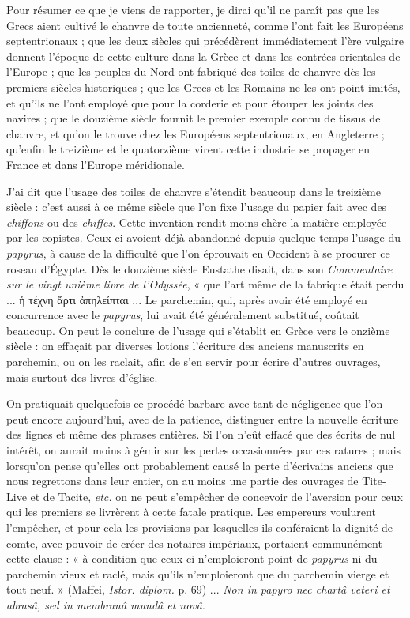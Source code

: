 \documentclass[a4paper, 11pt, oneside, polutonikogreek]{article}
\begin{document}
Pour résumer ce que je viens de rapporter, je dirai qu'il ne paraît pas que les Grecs aient cultivé le chanvre de toute ancienneté, comme l'ont fait les Européens septentrionaux ; que les deux siècles qui précédèrent immédiatement l'ère vulgaire donnent l'époque de cette culture dans la Grèce et dans les contrées orientales de l'Europe ; que les peuples du Nord ont fabriqué des toiles de chanvre dès les premiers siècles historiques ; que les Grecs et les Romains ne les ont point imités, et qu'ils ne l'ont employé que pour la corderie et pour étouper les joints des navires ; que le douzième siècle fournit le premier exemple connu de tissus de chanvre, et qu'on le trouve chez les Européens septentrionaux, en Angleterre ; qu'enfin le treizième et le quatorzième virent cette industrie se propager en France et dans l'Europe méridionale.

J'ai dit que l'usage des toiles de chanvre s'étendit beaucoup dans le treizième siècle : c'est aussi à ce même siècle que l'on fixe l'usage du papier fait avec des \emph{chiffons} ou des \emph{chiffes}. Cette invention rendit moins chère la matière employée par les copistes. Ceux-ci avoient déjà abandonné depuis quelque temps l'usage du \emph{papyrus}, à cause de la difficulté que l'on éprouvait en Occident à se procurer ce roseau d'Égypte. Dès le douzième siècle Eustathe disait, dans son \emph{Commentaire sur le vingt unième livre de l'Odyssée}, « que l'art même de la fabrique était perdu ... ἡ τέχνη ἄρτι ἀπηλείπται ... Le parchemin, qui, après avoir été employé en concurrence avec le \emph{papyrus}, lui avait été généralement substitué, coûtait beaucoup. On peut le conclure de l'usage qui s'établit en Grèce vers le onzième siècle : on effaçait par diverses lotions l'écriture des anciens manuscrits en parchemin, ou on les raclait, afin de s'en servir pour écrire d'autres ouvrages, mais surtout des livres d'église.

On pratiquait quelquefois ce procédé barbare avec tant de négligence que l'on peut encore aujourd'hui, avec de la patience, distinguer entre la nouvelle écriture des lignes et même des phrases entières. Si l'on n'eût effacé que des écrits de nul intérêt, on aurait moins à gémir sur les pertes occasionnées par ces ratures ; mais lorsqu'on pense qu'elles ont probablement causé la perte d'écrivains anciens que nous regrettons dans leur entier, on au moins une partie des ouvrages de Tite-Live et de Tacite, \emph{etc.} on ne peut s'empêcher de concevoir de l'aversion pour ceux qui les premiers se livrèrent à cette fatale pratique. Les empereurs voulurent l'empêcher, et pour cela les provisions par lesquelles ils conféraient la dignité de comte, avec pouvoir de créer des notaires impériaux, portaient communément cette clause : « à condition que ceux-ci n'emploieront point de \emph{papyrus} ni du parchemin vieux et raclé, mais qu'ils n'emploieront que du parchemin vierge et tout neuf. » (Maffei, \emph{Istor. diplom.} p. 69) ... \emph{Non in papyro nec chartâ veteri et abrasâ, sed in membranâ mundâ et novâ}.
\end{document}

